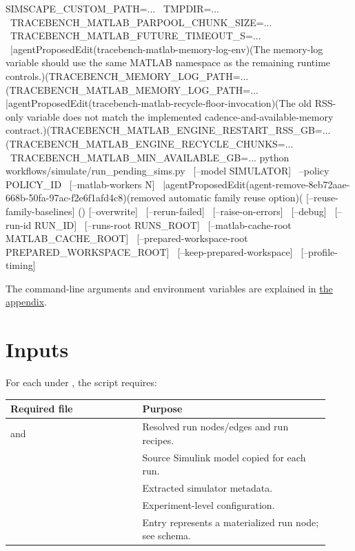 \documentclass[11pt]{article}
\begin{document}
\begingroup
{}
\begin{DocCode}
SIMSCAPE_CUSTOM_PATH=... \
TMPDIR=... \
TRACEBENCH_MATLAB_PARPOOL_CHUNK_SIZE=... \
TRACEBENCH_MATLAB_FUTURE_TIMEOUT_S=... \
|agentProposedEdit(tracebench-matlab-memory-log-env)(The memory-log variable should use the same MATLAB namespace as the remaining runtime controls.)(TRACEBENCH_MEMORY_LOG_PATH=... \)(TRACEBENCH_MATLAB_MEMORY_LOG_PATH=... \)
|agentProposedEdit(tracebench-matlab-recycle-floor-invocation)(The old RSS-only variable does not match the implemented cadence-and-available-memory contract.)(TRACEBENCH_MATLAB_ENGINE_RESTART_RSS_GB=... \)(TRACEBENCH_MATLAB_ENGINE_RECYCLE_CHUNKS=... \
TRACEBENCH_MATLAB_MIN_AVAILABLE_GB=... \)
python workflows/simulate/run_pending_sims.py \
  [--model SIMULATOR] \
  --policy POLICY_ID \
  [--matlab-workers N] \
|agentProposedEdit(agent-remove-8eb72aae-668b-50fa-97ac-f2e6f1afd4c8)(removed automatic family reuse option)(  [--reuse-family-baselines] \)()
  [--overwrite] \
  [--rerun-failed] \
  [--raise-on-errors] \
  [--debug] \
  [--run-id RUN_ID] \
  [--runs-root RUNS_ROOT] \
  [--matlab-cache-root MATLAB_CACHE_ROOT] \
  [--prepared-workspace-root PREPARED_WORKSPACE_ROOT] \
  [--keep-prepared-workspace] \
  [--profile-timing] \
\end{DocCode}
\endgroup

The command-line arguments and environment variables are explained in \hyperref[sec:simulate-cli-options]{the appendix}.

\section*{Inputs}

For each \termSimulator under , the script requires:
\begin{center}
\begin{tabular}{@{}p{0.38\linewidth}p{0.54\linewidth}@{}}
\toprule
Required file & Purpose \\
\midrule
\code{plans/<policy_id>/run_nodes.jsonl} and \code{plans/<policy_id>/run_edges.jsonl} & Resolved run nodes/edges and run recipes. \\
\code{simulink_model_original.mdl} & Source Simulink model copied for each run. \\
\code{generated/metadata.json} & Extracted simulator metadata. \\
\code{experiment_config.json} & Experiment-level configuration. \\
\hyperref[sec:simulation-model-record-schema]{\code{runs/model_record.json}} & Entry represents a materialized run node; see schema. \\
\bottomrule
\end{tabular}
\end{center}
\end{document}
